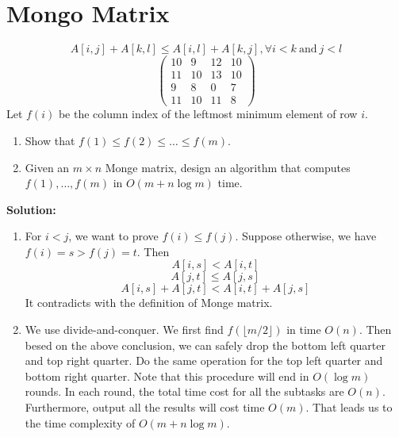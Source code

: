 \section{Mongo Matrix}
\[
A[i,j] + A[k,l] \le A[i,l]+A[k,j], \forall i<k\ \text{and}\ j<l
\]
\[\begin{pmatrix}
10 & 9 & 12 & 10\\
11 & 10 & 13 & 10\\
9 & 8 & 0 & 7\\
11 & 10 & 11 & 8
\end{pmatrix}\]
Let $f(i)$ be the column index of the leftmost minimum element of row $i$.
\begin{enumerate}
\item Show that $f(1)\le f(2)\le \dots\le f(m)$.
\item Given an $m\times n$ Monge matrix, design an algorithm that computes $f(1),\dots,f(m)$ in $O(m+n\log m)$ time.
\end{enumerate}
{\bf Solution:}
\begin{enumerate}
\item For $i < j$, we want to prove $f(i) \le f(j)$. Suppose otherwise, we have $f(i) = s > f(j) = t$. Then 
\[
A[i,s] < A[i,t]
\]
\[
A[j,t] \le A[j,s]
\]
\[
A[i,s] + A[j,t] < A[i,t] + A[j,s]
\]
It contradicts with the definition of Monge matrix.
\item We use divide-and-conquer. We first find $f(\lfloor m/2\rfloor)$ in time $O(n)$. Then besed on the above conclusion, we can safely drop the bottom left quarter and top right quarter. Do the same operation for the top left quarter and bottom right quarter. Note that this procedure will end in $O(\log m)$ rounds. In each round, the total time cost for all the subtasks are $O(n)$. Furthermore, output all the results will cost time $O(m)$. That leads us to the time complexity of $O(m+ n\log m)$.
\end{enumerate}
